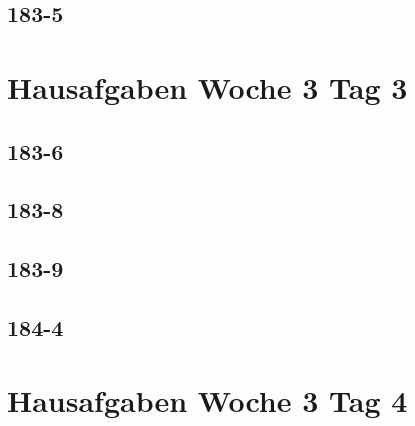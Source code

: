 \documentclass{article}
\begin{document}
\subsection*{183-5}
\section*{Hausafgaben Woche 3 Tag 3}
\subsection*{183-6}
\subsection*{183-8}
\subsection*{183-9}
\subsection*{184-4}
\section*{Hausafgaben Woche 3 Tag 4}
\end{document}
